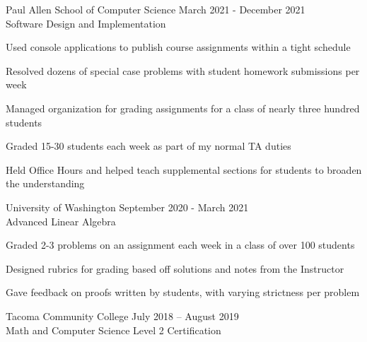 \documentclass[10pt]{article}
\newenvironment{itemize*}
{\begin{itemize}[leftmargin=*]
    \setlength{\parskip}{0.5pt}}
{\end{itemize}}
\begin{document}
\begin{description}[leftmargin=!,
                    labelwidth=\widthof{\bfseries Teaching Assistant}]

\item[Teaching Assistant] Paul Allen School of Computer Science \hfill 
    March 2021 - December 2021\\
    Software Design and Implementation
\end{description}
\begin{itemize*}
\item Used console applications to publish course assignments within a tight schedule
\item Resolved dozens of special case problems with student homework submissions per week
\item Managed organization for grading assignments for a class of nearly three hundred students
\item Graded 15-30 students each week as part of my normal TA duties
\item Held Office Hours and helped teach supplemental sections for students to
    broaden the understanding
\end{itemize*}
\vspace{10pt}

\begin{description}[leftmargin=!,
                    labelwidth=\widthof{\bfseries Grader}]
\item[Grader] University of Washington \hfill
    September 2020 - March 2021\\
    Advanced Linear Algebra
\end{description}
\begin{itemize*}
\item Graded 2-3 problems on an assignment each week in a class of over 100 students
\item Designed rubrics for grading based off solutions and notes from the Instructor
\item Gave feedback on proofs written by students, with varying strictness per problem
\end{itemize*}
\vspace{10pt}

\begin{description}[leftmargin=!,
                    labelwidth=\widthof{\bfseries Internationally Certified Tutor}]

\item[Internationally Certified Tutor] Tacoma Community College \hfill
    July 2018 – August 2019\\
    Math and Computer Science \hfill Level 2 Certification
\end{description}
\end{document}
